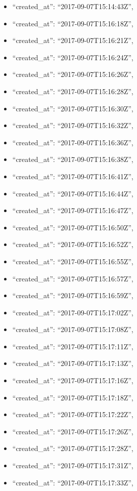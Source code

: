\begin{itemize}
\item
  ``created\_at'': ``2017-09-07T15:14:43Z'',
\item
  ``created\_at'': ``2017-09-07T15:16:18Z'',
\item
  ``created\_at'': ``2017-09-07T15:16:21Z'',
\item
  ``created\_at'': ``2017-09-07T15:16:24Z'',
\item
  ``created\_at'': ``2017-09-07T15:16:26Z'',
\item
  ``created\_at'': ``2017-09-07T15:16:28Z'',
\item
  ``created\_at'': ``2017-09-07T15:16:30Z'',
\item
  ``created\_at'': ``2017-09-07T15:16:32Z'',
\item
  ``created\_at'': ``2017-09-07T15:16:36Z'',
\item
  ``created\_at'': ``2017-09-07T15:16:38Z'',
\item
  ``created\_at'': ``2017-09-07T15:16:41Z'',
\item
  ``created\_at'': ``2017-09-07T15:16:44Z'',
\item
  ``created\_at'': ``2017-09-07T15:16:47Z'',
\item
  ``created\_at'': ``2017-09-07T15:16:50Z'',
\item
  ``created\_at'': ``2017-09-07T15:16:52Z'',
\item
  ``created\_at'': ``2017-09-07T15:16:55Z'',
\item
  ``created\_at'': ``2017-09-07T15:16:57Z'',
\item
  ``created\_at'': ``2017-09-07T15:16:59Z'',
\item
  ``created\_at'': ``2017-09-07T15:17:02Z'',
\item
  ``created\_at'': ``2017-09-07T15:17:08Z'',
\item
  ``created\_at'': ``2017-09-07T15:17:11Z'',
\item
  ``created\_at'': ``2017-09-07T15:17:13Z'',
\item
  ``created\_at'': ``2017-09-07T15:17:16Z'',
\item
  ``created\_at'': ``2017-09-07T15:17:18Z'',
\item
  ``created\_at'': ``2017-09-07T15:17:22Z'',
\item
  ``created\_at'': ``2017-09-07T15:17:26Z'',
\item
  ``created\_at'': ``2017-09-07T15:17:28Z'',
\item
  ``created\_at'': ``2017-09-07T15:17:31Z'',
\item
  ``created\_at'': ``2017-09-07T15:17:33Z'',

\end{itemize}
